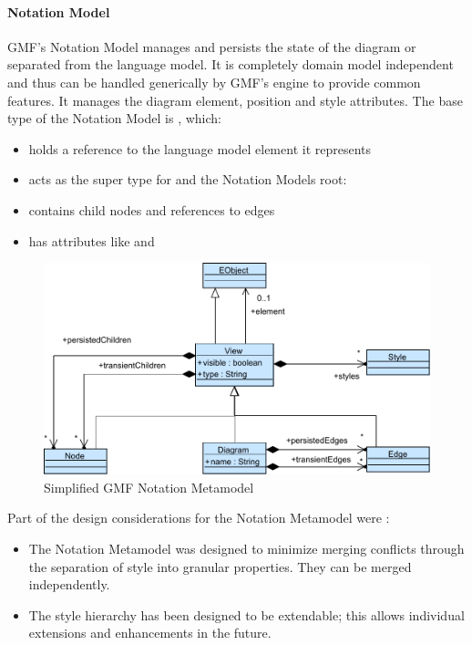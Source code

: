 \paragraph{Notation Model}
GMF's Notation Model manages and persists the state of the diagram or  separated from the language model. It is completely domain model independent and thus can be handled generically by GMF's engine to provide common features. It manages the diagram element, position and style attributes. \cite{EMP} The base type of the Notation Model is , which:
\begin{itemize}
	\item holds a reference to the language model element it represents 
	\item acts as the super type for  and the Notation Models root: 
	\item contains child nodes and references to edges
	\item has attributes like  and 
\end{itemize}

\begin{figure}
\centering
\includegraphics[scale=0.8]{gfx/ex/GMF_Notation} 
\caption{Simplified GMF Notation Metamodel}
\label{MM:GMF}
\end{figure}

Part of the design considerations for the Notation Metamodel were \cite{GMFDoc}:
\begin{itemize}
	\item The Notation Metamodel was designed to minimize merging conflicts through the separation of style into granular properties. They can be merged independently.
	\item The style hierarchy has been designed to be extendable; this allows individual extensions and enhancements in the future. 
\end{itemize}

